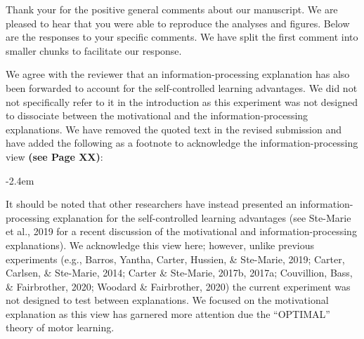 \documentclass[final]{article}
\renewenvironment{quote}{\begin{fquote}\advance\leftmargini -2.4em\begin{oldquote}}{\end{oldquote}\end{fquote}}
\newenvironment{fquote}
  {\def\FrameCommand{
	\fboxsep=0.6em %
	\fcolorbox{black}{white}}%
    \MakeFramed {\advance\hsize-2\width \FrameRestore}
    \begin{minipage}{\linewidth}
  }
  {\end{minipage}\endMakeFramed}
\begin{document}
Thank your for the positive general comments about our manuscript. We are pleased to hear that you were able to reproduce the analyses and figures. Below are the responses to your specific comments. We have split the first comment into smaller chunks to facilitate our response.


We agree with the reviewer that an information-processing explanation has also been forwarded to account for the self-controlled learning advantages. We did not not specifically refer to it in the introduction as this experiment was not designed to dissociate between the motivational and the information-processing explanations. We have removed the quoted text in the revised submission and have added the following as a footnote to acknowledge the information-processing view \textbf{(see Page XX)}:

\begin{quote}
It should be noted that other researchers have instead presented an information-processing explanation for the self-controlled learning advantages (see Ste-Marie et al., 2019 for a recent discussion of the motivational and information-processing explanations). We acknowledge this view here; however, unlike previous experiments (e.g., Barros, Yantha, Carter, Hussien, \& Ste-Marie, 2019; Carter, Carlsen, \& Ste-Marie, 2014; Carter \& Ste-Marie, 2017b, 2017a; Couvillion, Bass, \& Fairbrother, 2020; Woodard \& Fairbrother, 2020) the current experiment was not designed to test between explanations. We focused on the motivational explanation as this view has garnered more attention due the ``OPTIMAL'' theory of motor learning.
\end{quote}
\end{document}
